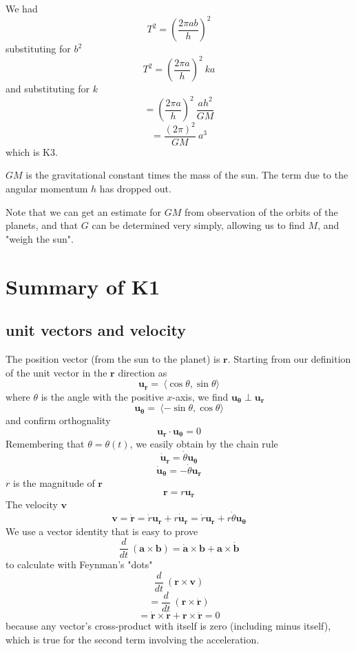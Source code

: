 \documentclass[11pt, oneside]{article}
\begin{document}
We had 
\[ T^2 = (\frac{2 \pi a b}{h})^2 \]
substituting for $b^2$
\[ T^2 = (\frac{2 \pi a}{h})^2 \ ka \]
and substituting for $k$
\[ = (\frac{2 \pi a }{h})^2 \  \frac{ah^2}{GM}  \]
\[ = \frac{(2 \pi)^2}{GM} \ a^3 \]
which is K3.  

$GM$ is the gravitational constant times the mass of the sun.  The term due to the angular momentum $h$ has dropped out.

Note that we can get an estimate for $GM$ from observation of the orbits of the planets, and that $G$ can be determined very simply, allowing us to find $M$, and "weigh the sun".

\section*{Summary of K1}

\subsection*{unit vectors and velocity}
The position vector (from the sun to the planet) is $\mathbf{r}$.  Starting from our definition of the unit vector in the $\mathbf{r}$ direction as
\[ \mathbf{u_r} = \ \langle \cos \theta, \sin \theta \rangle \]
where $\theta$ is the angle with the positive $x$-axis, we find $\mathbf{u_{\theta}} \perp \mathbf{u_r}$
\[ \mathbf{u_{\theta}} = \ \langle -\sin \theta, \cos \theta \rangle \]
and confirm orthognality
\[ \mathbf{u_r} \cdot \mathbf{u_{\theta}} = 0 \]
Remembering that $\theta = \theta(t)$, we easily obtain by the chain rule
\[ \dot{\mathbf{u}}_\mathbf{r} = \dot{\theta} \mathbf{u_{\theta}} \]
\[  \dot{\mathbf{u}}_\mathbf{\theta} = -\dot{\theta} \mathbf{u_{r}} \]
$r$ is the magnitude of $\mathbf{r}$
\[ \mathbf{r} = r \mathbf{u_r} \]
The velocity $\mathbf{v}$
\[ \mathbf{v} = \dot{\mathbf{r}} = \dot{r} \mathbf{u_r} + r \dot{\mathbf{u}}_\mathbf{r}  =  \dot{r} \mathbf{u_r} +  r \dot{\theta}  \mathbf{u_{\theta}}\]
We use a vector identity that is easy to prove
\[ \frac{d}{dt} \ (\mathbf{a} \times \mathbf{b}) = \dot{\mathbf{a}} \times \mathbf{b} + \mathbf{a} \times \dot{\mathbf{b}} \]
to calculate with Feynman's "dots"
\[ \frac{d}{dt} \ (\mathbf{r} \times \mathbf{v}) \]
\[ =  \frac{d}{dt} \ (\mathbf{r} \times \dot{\mathbf{r}}) \]
\[  =  \dot{\mathbf{r}} \times \dot{\mathbf{r}} +  \mathbf{r} \times \ddot{\mathbf{r}} = 0\]
because any vector's cross-product with itself is zero (including minus itself), which is true for the second term involving the acceleration.
\end{document}
